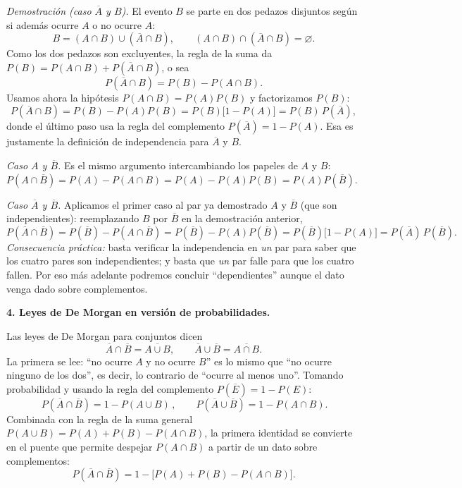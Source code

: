 \documentclass[11pt]{article}
\begin{document}
\begin{teo}
\emph{Demostración (caso $\overline{A}$ y $B$).} El evento $B$ se parte en dos pedazos
disjuntos según si además ocurre $A$ o no ocurre $A$:
\[
B=(A\cap B)\cup(\overline{A}\cap B),\qquad (A\cap B)\cap(\overline{A}\cap B)=\varnothing .
\]
Como los dos pedazos son excluyentes, la regla de la suma da
$P(B)=P(A\cap B)+P(\overline{A}\cap B)$, o sea
\[
P(\overline{A}\cap B)=P(B)-P(A\cap B).
\]
Usamos ahora la hipótesis $P(A\cap B)=P(A)P(B)$ y factorizamos $P(B)$:
\[
P(\overline{A}\cap B)=P(B)-P(A)P(B)=P(B)\bigl[1-P(A)\bigr]=P(B)\,P(\overline{A}),
\]
donde el último paso usa la regla del complemento $P(\overline{A})=1-P(A)$. Esa es
justamente la definición de independencia para $\overline{A}$ y $B$.

\emph{Caso $A$ y $\overline{B}$.} Es el mismo argumento intercambiando los papeles de $A$ y
$B$: $P(A\cap\overline{B})=P(A)-P(A\cap B)=P(A)-P(A)P(B)=P(A)P(\overline{B})$.

\emph{Caso $\overline{A}$ y $\overline{B}$.} Aplicamos el primer caso al par ya demostrado
$A$ y $\overline{B}$ (que son independientes): reemplazando $B$ por $\overline{B}$ en la
demostración anterior,
\[
P(\overline{A}\cap\overline{B})=P(\overline{B})-P(A\cap\overline{B})
=P(\overline{B})-P(A)P(\overline{B})=P(\overline{B})\bigl[1-P(A)\bigr]
=P(\overline{A})\,P(\overline{B}).
\]
\emph{Consecuencia práctica:} basta verificar la independencia en \emph{un} par para saber
que los cuatro pares son independientes; y basta que \emph{un} par falle para que los cuatro
fallen. Por eso más adelante podremos concluir ``dependientes'' aunque el dato venga dado
sobre complementos.

\medskip
\textbf{4. Leyes de De Morgan en versión de probabilidades.}

Las leyes de De Morgan para conjuntos dicen
\[
\overline{A}\cap\overline{B}=\overline{A\cup B},\qquad
\overline{A}\cup\overline{B}=\overline{A\cap B}.
\]
La primera se lee: ``no ocurre $A$ y no ocurre $B$'' es lo mismo que ``no ocurre ninguno de
los dos'', es decir, lo contrario de ``ocurre al menos uno''. Tomando probabilidad y usando
la regla del complemento $P(\overline{E})=1-P(E)$:
\[
\boxed{\,P(\overline{A}\cap\overline{B})=1-P(A\cup B)\,},\qquad
P(\overline{A}\cup\overline{B})=1-P(A\cap B).
\]
Combinada con la regla de la suma general
$P(A\cup B)=P(A)+P(B)-P(A\cap B)$, la primera identidad se convierte en el puente que
permite despejar $P(A\cap B)$ a partir de un dato sobre complementos:
\[
P(\overline{A}\cap\overline{B})=1-\bigl[P(A)+P(B)-P(A\cap B)\bigr].
\]


\end{teo}
\end{document}
